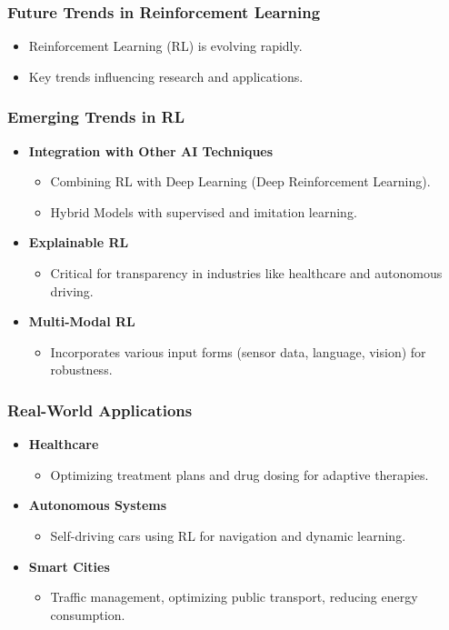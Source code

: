 \documentclass{beamer}
\begin{document}
\begin{frame}
    \frametitle{Future Trends in Reinforcement Learning}
    \begin{itemize}
        \item Reinforcement Learning (RL) is evolving rapidly.
        \item Key trends influencing research and applications.
    \end{itemize}
\end{frame}

\begin{frame}
    \frametitle{Emerging Trends in RL}
    \begin{itemize}
        \item \textbf{Integration with Other AI Techniques}
            \begin{itemize}
                \item Combining RL with Deep Learning (Deep Reinforcement Learning).
                \item Hybrid Models with supervised and imitation learning.
            \end{itemize}
        \item \textbf{Explainable RL}
            \begin{itemize}
                \item Critical for transparency in industries like healthcare and autonomous driving.
            \end{itemize}
        \item \textbf{Multi-Modal RL}
            \begin{itemize}
                \item Incorporates various input forms (sensor data, language, vision) for robustness.
            \end{itemize}
    \end{itemize}
\end{frame}

\begin{frame}
    \frametitle{Real-World Applications}
    \begin{itemize}
        \item \textbf{Healthcare}
            \begin{itemize}
                \item Optimizing treatment plans and drug dosing for adaptive therapies.
            \end{itemize}
        \item \textbf{Autonomous Systems}
            \begin{itemize}
                \item Self-driving cars using RL for navigation and dynamic learning.
            \end{itemize}
        \item \textbf{Smart Cities}
            \begin{itemize}
                \item Traffic management, optimizing public transport, reducing energy consumption.
            \end{itemize}
    \end{itemize}
\end{frame}
\end{document}

